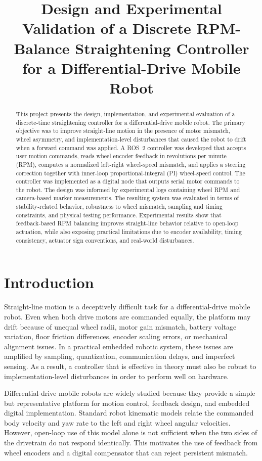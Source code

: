 \documentclass[conference]{IEEEtran}
\title{Design and Experimental Validation of a Discrete RPM-Balance Straightening Controller for a Differential-Drive Mobile Robot}
\author{
\IEEEauthorblockN{Your Name}
\IEEEauthorblockA{
ME57800 Digital Controls Final Project\\
Purdue University\\
Email: your-email@purdue.edu
}
}
\begin{document}
\maketitle

\begin{abstract}
This project presents the design, implementation, and experimental evaluation of a discrete-time straightening controller for a differential-drive mobile robot. The primary objective was to improve straight-line motion in the presence of motor mismatch, wheel asymmetry, and implementation-level disturbances that caused the robot to drift when a forward command was applied. A ROS~2 controller was developed that accepts user motion commands, reads wheel encoder feedback in revolutions per minute (RPM), computes a normalized left-right wheel-speed mismatch, and applies a steering correction together with inner-loop proportional-integral (PI) wheel-speed control. The controller was implemented as a digital node that outputs serial motor commands to the robot. The design was informed by experimental logs containing wheel RPM and camera-based marker measurements. The resulting system was evaluated in terms of stability-related behavior, robustness to wheel mismatch, sampling and timing constraints, and physical testing performance. Experimental results show that feedback-based RPM balancing improves straight-line behavior relative to open-loop actuation, while also exposing practical limitations due to encoder availability, timing consistency, actuator sign conventions, and real-world disturbances.
\end{abstract}

\section{Introduction}
Straight-line motion is a deceptively difficult task for a differential-drive mobile robot. Even when both drive motors are commanded equally, the platform may drift because of unequal wheel radii, motor gain mismatch, battery voltage variation, floor friction differences, encoder scaling errors, or mechanical alignment issues. In a practical embedded robotic system, these issues are amplified by sampling, quantization, communication delays, and imperfect sensing. As a result, a controller that is effective in theory must also be robust to implementation-level disturbances in order to perform well on hardware.

Differential-drive mobile robots are widely studied because they provide a simple but representative platform for motion control, feedback design, and embedded digital implementation. Standard robot kinematic models relate the commanded body velocity and yaw rate to the left and right wheel angular velocities. However, open-loop use of this model alone is not sufficient when the two sides of the drivetrain do not respond identically. This motivates the use of feedback from wheel encoders and a digital compensator that can reject persistent mismatch.
\end{document}

